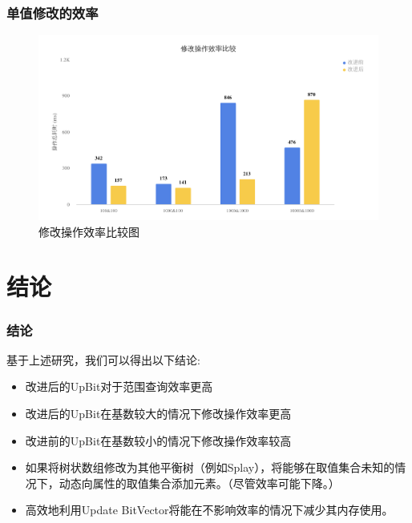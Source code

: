 \documentclass[hyperref={unicode=true}]{beamer}
\begin{document}
\begin{frame}\frametitle{单值修改的效率}
  \begin{figure}[H]
    \begin{center}
      \includegraphics[width=4.5in]{update.png}
      \caption{修改操作效率比较图}\label{fig:update}
    \end{center}
  \end{figure}
\end{frame}

\section{结论}
\begin{frame}\frametitle{结论}
  基于上述研究，我们可以得出以下结论:
  \begin{itemize}[<+->]
  \item 改进后的UpBit对于范围查询效率更高
  \item 改进后的UpBit在基数较大的情况下修改操作效率更高
  \item 改进前的UpBit在基数较小的情况下修改操作效率较高
  \item 如果将树状数组修改为其他平衡树（例如Splay），将能够在取值集合未知的情况下，动态向属性的取值集合添加元素。（尽管效率可能下降。）
  \item 高效地利用Update BitVector将能在不影响效率的情况下减少其内存使用。
  \end{itemize}
\end{frame}
\end{document}
